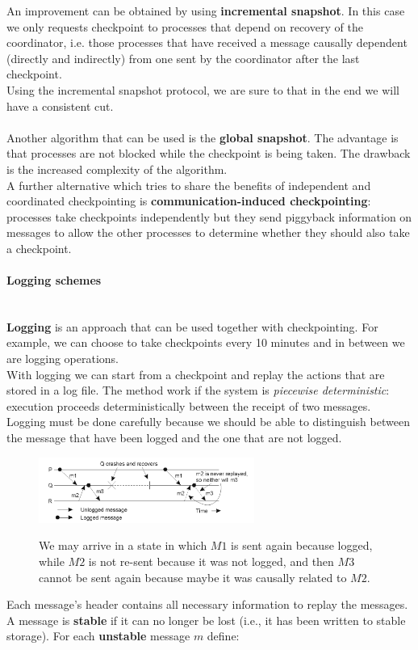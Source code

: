 \documentclass[10pt,a4paper]{article}
\newcommand{\myparagraph}[1]{\paragraph{#1}\mbox{}\\[0.05in]}
\begin{document}
An improvement can be obtained by using \textbf{incremental snapshot}. In this case we only requests checkpoint to processes that depend on recovery of the coordinator, i.e. those processes that have received a message causally dependent (directly and indirectly) from one sent by the coordinator after the last checkpoint. \\
Using the incremental snapshot protocol, we are sure to that in the end we will have a consistent cut. \\ \\
Another algorithm that can be used is the \textbf{global snapshot}. The advantage is that processes are not blocked while the checkpoint is being taken. The drawback is the increased complexity of the algorithm. \\ A further alternative which tries to share the benefits of independent and coordinated checkpointing is \textbf{communication-induced checkpointing}: processes take checkpoints independently but they send piggyback information on messages to allow the other processes to determine whether they should also take a checkpoint.
\myparagraph{Logging schemes}
\textbf{Logging} is an approach that can be used together with checkpointing. For example, we can choose to take checkpoints every 10 minutes and in between we are logging operations. \\
With logging we can start from a checkpoint and replay the actions that are stored in a log file. The method work if the system is \textit{piecewise deterministic}: execution proceeds deterministically between the receipt of two messages. \\ Logging must be done carefully because we should be able to distinguish between the message that have been logged and the one that are not logged.
\begin{figure}[h!]
\hfill \includegraphics[width=200pt]{images/logging.png}\hspace*{\fill}
  \label{fig:logging}
  \caption{We may arrive in a state in which $M1$ is sent again because logged, while $M2$ is not re-sent because it was not logged, and then $M3$ cannot be sent again because maybe it was causally related to $M2$.}
\end{figure} 
Each message's header contains all necessary information to replay the messages. A message is \textbf{stable} if it can no longer be lost (i.e., it has been written to stable storage). For each \textbf{unstable} message $m$ define:
\end{document}
